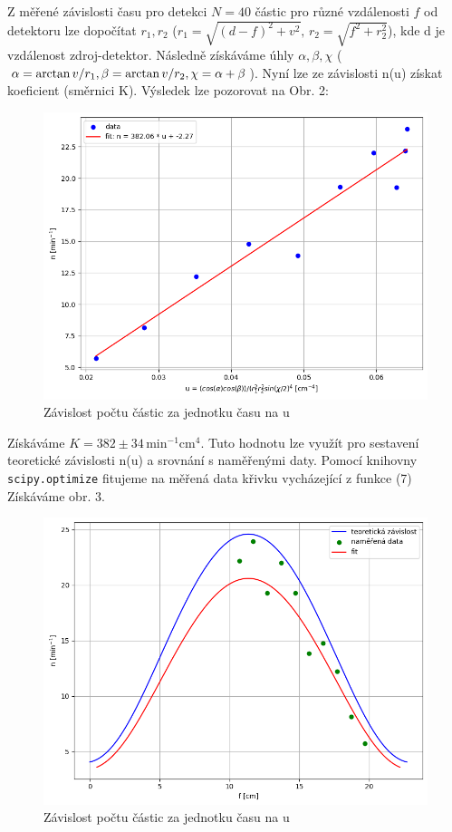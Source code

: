 \documentclass[czech,11pt,a4paper]{article}
\begin{document}
\begin{multicols}{2}
		Z měřené závislosti času pro detekci $N=40$ částic pro různé vzdálenosti $f$ od detektoru lze dopočítat $r_1, r_2$ ($r_1 = \sqrt{(d-f)^2 + v^2},\, r_2 = \sqrt{f^2 + r_2^2}$), kde d je vzdálenost zdroj-detektor. Následně získáváme úhly $\alpha, \beta, \chi$ ($\alpha = \arctan v/r_1, \, \\\beta = \arctan v/r_2, \chi = \alpha+\beta$). Nyní lze ze závislosti n(u) získat koeficient (směrnici K). Výsledek lze pozorovat na Obr. 2:
		\begin{figure}[H]
			\centering
			\includegraphics[width=0.9\linewidth]{fig2}
			\caption{Závislost počtu částic za jednotku času na u}
			
		\end{figure}
		Získáváme $K = 382 \pm 34 \,\mathrm{min^{-1} cm^4}$. Tuto hodnotu lze využít pro sestavení teoretické závislosti n(u) a srovnání s naměřenými daty. Pomocí knihovny \verb*|scipy.optimize| fitujeme na měřená data křivku vycházející z funkce (7) Získáváme obr. 3.
		\begin{figure}[H]
			\centering
			\includegraphics[width=0.9\linewidth]{fig3}
			\caption{Závislost počtu částic za jednotku času na u}
			

\end{figure}
\end{multicols}
\end{document}
